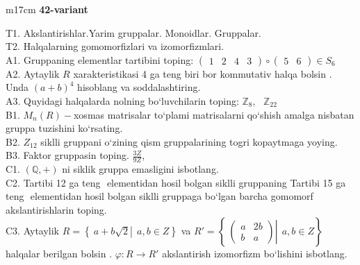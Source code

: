 \documentclass{article}
\begin{document}
\begin{tabular}{m{17cm}}
\textbf{42-variant}
\newline

T1. Akslantirishlar.Yarim gruppalar. Monoidlar. Gruppalar. \\
T2. Halqalarning gomomorfizlari va izomorfizmlari. \\
A1. Gruppaning elementlar tartibini toping: \(\begin{pmatrix}
1 & 2 & 4 & 3
\end{pmatrix} \circ \begin{pmatrix}
5 & 6
\end{pmatrix} \in S_{6}\) \\
A2. Aytaylik \(R\) xarakteristikasi 4 ga teng biri bor kommutativ halqa bo\textquotesingle lsin . Unda \((a + b)^{4}\) hisoblang va soddalashtiring. \\
A3. Quyidagi halqalarda nolning bo`luvchilarin toping: \(\mathbb{Z}_{8},\ \ \ \mathbb{Z}_{22}\) \\
B1. \(M_{n}(R) -\)xosmas matrisalar to`plami matrisalarni qo`shish amalga nisbatan gruppa tuzishini ko`rsating. \\
B2. \(Z_{12}\) siklli gruppani o`zining qism gruppalarining tog\textquotesingle ri kopaytmaga yoying. \\
B3. Faktor gruppasin toping. \(\frac{3Z}{9Z}\), \\
C1. \((\mathbb{Q}, + )\) ni siklik gruppa emasligini isbotlang. \\
C2. Tartibi 12 ga teng \(< a >\) elementidan hosil bo\textquotesingle lgan siklli gruppaning Tartibi 15 ga teng \(< b >\) elementidan hosil bo\textquotesingle lgan siklli gruppaga bo`lgan barcha gomomorf akslantirishlarin toping. \\
C3. Aytaylik \(R = \left\{ \left. \ a + b\sqrt{2} \right|\ \ a,b \in Z \right\}\) va \(R' = \left\{ \left. \ \begin{pmatrix}
a & 2b \\
b & a
\end{pmatrix} \right|\ \ a,b \in Z \right\}\) halqalar berilgan bo\textquotesingle lsin . \(\varphi:R \rightarrow R'\) akslantirish izomorfizm bo`lishini isbotlang. \\

\end{tabular}
\vspace{1cm}
\end{document}
